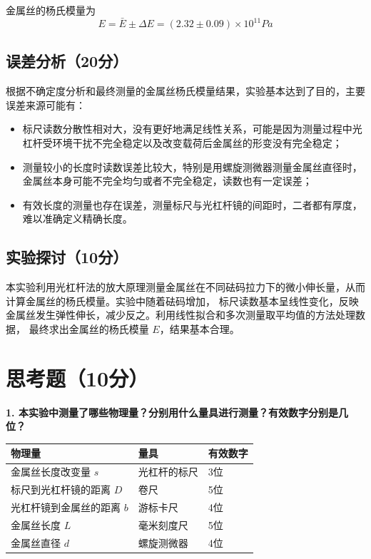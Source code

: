 \documentclass{Phyport}
\begin{document}
金属丝的杨氏模量为
\[
E = \bar{E} \pm \Delta E = (2.32 \pm 0.09) \times 10^{11} Pa 
\]

\subsection{误差分析（20分）}

根据不确定度分析和最终测量的金属丝杨氏模量结果，实验基本达到了目的，主要误差来源可能有：
\begin{itemize}
    \item 标尺读数分散性相对大，没有更好地满足线性关系，可能是因为测量过程中光杠杆受环境干扰不完全稳定以及改变载荷后金属丝的形变没有完全稳定；
    \item 测量较小的长度时读数误差比较大，特别是用螺旋测微器测量金属丝直径时，金属丝本身可能不完全均匀或者不完全稳定，读数也有一定误差；
    \item 有效长度的测量也存在误差，测量标尺与光杠杆镜的间距时，二者都有厚度，难以准确定义精确长度。
\end{itemize}

\subsection{实验探讨（10分）}

本实验利用光杠杆法的放大原理测量金属丝在不同砝码拉力下的微小伸长量，从而计算金属丝的杨氏模量。实验中随着砝码增加，
标尺读数基本呈线性变化，反映金属丝发生弹性伸长，减少反之。利用线性拟合和多次测量取平均值的方法处理数据，
最终求出金属丝的杨氏模量 $E$，结果基本合理。

\section{思考题（10分）}

\textbf{1. 本实验中测量了哪些物理量？分别用什么量具进行测量？有效数字分别是几位？}

\begin{table}[htbp!]
    \centering
    \begin{tabular}{|l|l|l|}
        \hline
        物理量 & 量具 & 有效数字 \\ 
        \hline
        金属丝长度改变量 $s$ & 光杠杆的标尺 & 3位 \\ 
        标尺到光杠杆镜的距离 $D$ & 卷尺 & 5位 \\
        光杠杆镜到金属丝的距离 $b$ & 游标卡尺 & 4位 \\
        金属丝长度 $L$ & 毫米刻度尺 & 5位 \\
        金属丝直径 $d$ & 螺旋测微器 & 4位 \\
        \hline
    \end{tabular}
\end{table}
\end{document}
